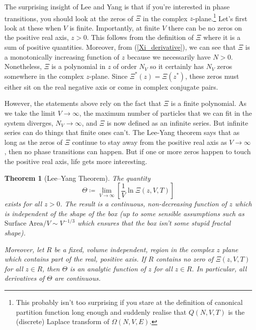 \documentclass{article}
\theoremstyle{plain}\theoremheaderfont{\normalfont\bfseries}\theorembodyfont{\rmfamily}\theoremseparator{.}\newtheorem*{thm}{Theorem}\newtheorem*{law}{Law}\newtheorem*{pos}{Postulate}
\numberwithin{equation}{section}
\begin{document}
    The surprising insight of Lee and Yang is that if you're interested in phase transitions, you should look at the zeros of \(\Xi\) in the complex \(z\)-plane.\footnote{This probably isn't too surprising if you stare at the definition of canonical partition function long enough and suddenly realise that \(Q(N,V,T)\) is the (discrete) Laplace transform of \(\Omega(N,V,E)\).} Let's first look at these when \(V\) is finite. Importantly, at finite \(V\) there can be no zeros on the positive real axis, \(z>0\). This follows from the definition of \(\Xi\) where it is a sum of positive quantities. Moreover, from (\ref{Xi_derivative}), we can see that \(\Xi\) is a monotonically increasing function of \(z\) because we necessarily have \(N>0\). Nonetheless, \(\Xi\) is a polynomial in \(z\) of order \(N_V\) so it certainly has \(N_V\) zeros somewhere in the complex \(z\)-plane. Since \(\Xi^*(z)=\Xi(z^*)\), these zeros must either sit on the real negative axis or come in complex conjugate pairs.

    However, the statements above rely on the fact that \(\Xi\) is a finite polynomial. As we take the limit \(V\to\infty\), the maximum number of particles that we can fit in the system diverges, \(N_V\to\infty\), and \(\Xi\) is now defined as an infinite series. But infinite series can do things that finite ones can't. The Lee-Yang theorem says that as long as the zeros of \(\Xi\) continue to stay away from the positive real axis as \(V\to\infty\), then no phase transitions can happen. But if one or more zeros happen to touch the positive real axis, life gets more interesting.

    \begin{thm}[Lee--Yang Theorem]
        The quantity
        \begin{equation}
            \Theta\coloneqq\lim_{V\to\infty}\left[\frac{1}{V}\ln\Xi(z,V,T)\right]
        \end{equation}
        exists for all \(z>0\). The result is a continuous, non-decreasing function of \(z\) which is independent of the shape of the box (up to some sensible assumptions such as \(\text{Surface Area}/V\sim V^{-1/3}\) which ensures that the box isn't some stupid fractal shape).

        Moreover, let \(R\) be a fixed, volume independent, region in the complex \(z\) plane which contains part of the real, positive axis. If \(R\) contains no zero of \(\Xi(z,V,T)\) for all \(z\in R\), then \(\Theta\) is an analytic function of \(z\) for all \(z\in R\). In particular, all derivatives of \(\Theta\) are continuous.
    \end{thm}
\end{document}
